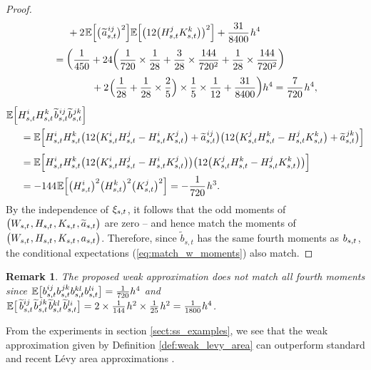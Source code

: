 \documentclass[sn-mathphys-num]{sn-jnl}%
\newtheorem{remark}{Remark}%
\newcommand{\E}{\mathbb{E}}
\newcommand{\m}{\hspace{0.25mm}}
\newcommand{\mm}{\hspace{5mm}}
\begin{document}
\begin{proof}
\begin{align*}
&\mm + 2\m\E\Big[\big(\m\widetilde{a}_{s,t}^{\m ij}\big)^2\Big]\E\Big[\big(12\big(H_{s,t}^j K_{s,t}^k\big)\big)^2\Big] + \frac{31}{8400}\m h^4\\[2pt]
& = \bigg(\frac{1}{450} + 24\bigg(\frac{1}{720}\times \frac{1}{28} + \frac{3}{28}\times \frac{144}{720^2} + \frac{1}{28}\times \frac{144}{720^2}\bigg)\\
&\hspace{13.5mm} + 2\m\Big(\frac{1}{28} + \frac{1}{28}\times\frac{2}{5}\Big)\times \frac{1}{5}\times\frac{1}{12} + \frac{31}{8400}\bigg) h^4 = \frac{7}{720}\m h^4,
\end{align*}
\begin{align*}
&\E\Big[H_{s,t}^i H_{s,t}^k\m \widetilde{b}_{s,t}^{\m ij}\widetilde{b}_{s,t}^{\m jk}\Big]\\
&\mm = \E\Big[H_{s,t}^i H_{s,t}^k\big(12\big(K_{s,t}^i H_{s,t}^j - H_{s,t}^i K_{s,t}^j\big) + \widetilde{a}_{s,t}^{\m ij}\big)\big(12\big(K_{s,t}^j H_{s,t}^k - H_{s,t}^j K_{s,t}^k\big) + \widetilde{a}_{s,t}^{\m jk}\big)\Big]\\[3pt]
&\mm = \E\Big[H_{s,t}^i H_{s,t}^k\big(12\big(K_{s,t}^i H_{s,t}^j - H_{s,t}^i K_{s,t}^j\big)\big)\big(12\big(K_{s,t}^j H_{s,t}^k - H_{s,t}^j K_{s,t}^k\big)\big)\Big]\\
&\mm = -144\m\E\Big[\big(H_{s,t}^i\big)^2 \big(H_{s,t}^k\big)^2 \big(K_{s,t}^j\big)^2\Big] = -\frac{1}{720}\m h^3.
\end{align*}
By the independence of $\xi_{s,t}\m$, it follows that the odd moments of $\big(W_{s,t}\m, H_{s,t}\m, K_{s,t}\m, \widetilde{a}_{s,t}\big)$ are zero -- and hence match the moments of $\big(W_{s,t}\m, H_{s,t}\m, K_{s,t}\m, a_{s,t}\big)$. Therefore, since $\widetilde{b}_{s,t}$ has the same fourth moments as $b_{s,t}\m$, the conditional expectations (\ref{eq:match_w_moments}) also match.
\end{proof}
\begin{remark}\label{rmk:not_perfect}The proposed weak approximation does not match all fourth moments\vspace{1mm} since $\m\E\big[b_{s,t}^{ij}b_{s,t}^{\m jk}b_{s,t}^{kl}b_{s,t}^{li}\big] = \frac{1}{720}h^4$ and $\m\E\big[\,\widetilde{b}_{s,t}^{ij}\m\widetilde{b}_{s,t}^{\m jk}\m\widetilde{b}_{s,t}^{kl}\m\widetilde{b}_{s,t}^{li}\big] = 2\times\frac{1}{144}\m h^2\times\frac{1}{25}\m h^2 = \frac{1}{1800}h^4$.
\end{remark}\medbreak

From the experiments in section \ref{sect:ss_examples}, we see that the weak approximation given by Definition \ref{def:weak_levy_area} can outperform standard and recent L\'{e}vy area approximations \cite{jelincic2025levygan, davie2014area, mrongowius2022area}.\medbreak
\end{document}
